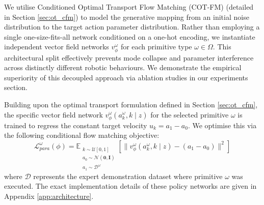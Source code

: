 \documentclass[journal]{IEEEtran}
\begin{document}
We utilise Conditioned Optimal Transport Flow Matching (COT-FM) \cite{black2024pi0, lipman2022flow, liu2022rectified} (detailed in Section \ref{sec:ot_cfm}) to model the generative mapping from an initial noise distribution to the target action parameter distribution. Rather than employing a single one-size-fits-all network conditioned on a one-hot encoding, we instantiate independent vector field networks $v_{\phi}^{\omega}$ for each primitive type $\omega \in \Omega$. This architectural split effectively prevents mode collapse and parameter interference across distinctly different robotic behaviours. We demonstrate the empirical superiority of this decoupled approach via ablation studies in our experiments section.

Building upon the optimal transport formulation defined in Section \ref{sec:ot_cfm}, the specific vector field network $v_{\phi}^{\omega}(a_k^\omega, k \mid z)$ for the selected primitive $\omega$ is trained to regress the constant target velocity $u_k = a_1 - a_0$. We optimise this via the following conditional flow matching objective:
$$\mathcal{L}_{para}^{\omega}(\phi) = \mathbb{E}_{\substack{k \sim \mathcal{U}[0,1] \\ a_0 \sim \mathcal{N}(\bm{0}, \bm{I}) \\ a_1 \sim \mathcal{D}^\omega}} \left[ \| v_{\phi}^{\omega}(a_k^\omega, k \mid z) - (a_1 - a_0) \|^2 \right]$$
where $\mathcal{D}$ represents the expert demonstration dataset where primitive $\omega$ was executed. The exact implementation details of these policy networks are given in Appendix \ref{app:architecture}.



\end{document}
